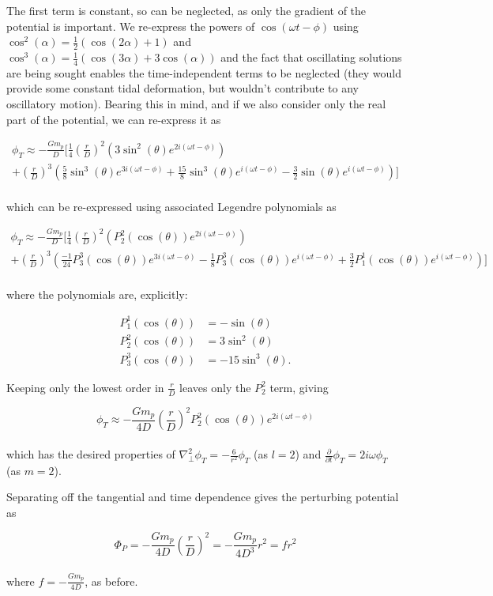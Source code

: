 \documentclass[11pt]{amsart}
\begin{document}
The first term is constant, so can be neglected, as only the gradient of the potential is important.
We re-express the powers of $\cos(\omega t - \phi)$ using $\cos^{2}(\alpha) = \frac{1}{2} (\cos(2\alpha) + 1)$ and $\cos^{3}(\alpha) = \frac{1}{4} (\cos(3\alpha) + 3 \cos(\alpha))$ 
and the fact that oscillating solutions are being sought enables the time-independent terms to be neglected (they would provide
some constant tidal deformation, but wouldn't contribute to any oscillatory motion).  Bearing this in mind, and if we also consider only the
real part of the potential, we can re-express it as

\begin{multline}
\phi_{T} \approx - \frac{G m_{p}}{D} \Big[
\frac{1}{4} \left( \frac{r}{D} \right)^{2} \left( 3 \sin^{2}(\theta) e^{2 i (\omega t - \phi)} \right)  \\
+ \left( \frac{r}{D} \right)^{3} \left( \frac{5}{8} \sin^{3}(\theta) e^{3 i (\omega t - \phi)} + \frac{15}{8} \sin^{3}(\theta) e^{i (\omega t - \phi)}  - \frac{3}{2} \sin (\theta) e^{i (\omega t - \phi)}\right)
\Big]
\end{multline}
\\
which can be re-expressed using associated Legendre polynomials as 

\begin{multline}
\phi_{T} \approx - \frac{G m_{p}}{D} \Big[
\frac{1}{4} \left( \frac{r}{D} \right)^{2} \left( P_{2}^{2} (\cos (\theta)) e^{2 i (\omega t - \phi)} \right)  \\
+ \left( \frac{r}{D} \right)^{3} \left( \frac{-1}{24} P_{3}^{3} (\cos (\theta)) e^{3 i (\omega t - \phi)} - \frac{1}{8} P_{3}^{3} (\cos (\theta)) e^{i (\omega t - \phi)}  + \frac{3}{2} P_{1}^{1} (\cos (\theta)) e^{i (\omega t - \phi)}\right)
\Big]
\end{multline}
\\
where the polynomials are, explicitly:

\begin{align}
P_{1}^{1} (\cos (\theta)) &= - \sin(\theta) \\
P_{2}^{2} (\cos (\theta)) &= 3 \sin^{2}(\theta) \\
P_{3}^{3} (\cos (\theta)) &= - 15 \sin^{3}(\theta).
\end{align}

Keeping only the lowest order in $\frac{r}{D}$ leaves only the $P_{2}^{2}$ term, giving

\begin{equation}
\phi_{T} \approx - \frac{G m_{p}}{4 D}  \left( \frac{r}{D} \right)^{2}  P_{2}^{2} (\cos (\theta)) e^{2 i (\omega t - \phi)} 
\end{equation}
\\
which has the desired properties of $\nabla_{\perp}^{2} \phi_{T} = - \frac{6}{r^2} \phi_{T}$ (as $l=2$) and $\frac{\partial}{\partial t} \phi_{T} = 2 i \omega \phi_{T}$ (as $m=2$).

Separating off the tangential and time dependence gives the perturbing potential as

\begin{equation}
\Phi_{P} = - \frac{G m_{p}}{4 D}  \left( \frac{r}{D} \right)^{2} = - \frac{G m_{p}}{4 D^{3}} r^{2} = f r^{2}
\end{equation}
\\
where $f = - \frac{G m_{p}}{4 D}$, as before.
\end{document}
